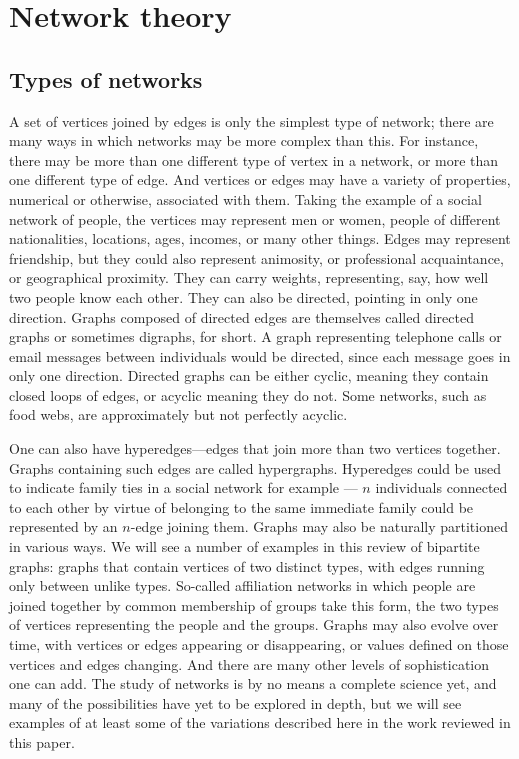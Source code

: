 \section{Network theory}

  \subsection{Types of networks}
    
    A set of vertices joined by edges is only the simplest type of network; there are many ways in which networks may be more complex than this. For instance, there may be more than one different type of vertex in a network, or more than one different type of edge. And vertices or edges may have a variety of properties, numerical or otherwise, associated with them. Taking the example of a social network of people, the vertices may represent men or women, people of different nationalities, locations, ages, incomes, or many other things. Edges may represent friendship, but they could also represent animosity, or professional acquaintance, or geographical proximity. They can carry weights, representing, say, how well two people know each other. They can also be directed, pointing in only one direction. Graphs composed of directed edges are themselves called directed graphs or sometimes digraphs, for short. A graph representing telephone calls or email messages between individuals would be directed, since each message goes in only one direction. Directed graphs can be either cyclic, meaning they contain closed loops of edges, or acyclic meaning they do not. Some networks, such as food webs, are approximately but not perfectly acyclic.
    
    One can also have hyperedges—edges that join more than two vertices together. Graphs containing such edges are called hypergraphs. Hyperedges could be used to indicate family ties in a social network for example --- $n$ individuals connected to each other by virtue of belonging to the same immediate family could be represented by an $n$-edge joining them. Graphs may also be naturally partitioned in various ways. We will see a number of examples in this review of bipartite graphs: graphs that contain vertices of two distinct types, with edges running only between unlike types. So-called affiliation networks in which people are joined together by common membership of groups take this form, the two types of vertices representing the people and the groups. Graphs may also evolve over time, with vertices or edges appearing or disappearing, or values defined on those vertices and edges changing. And there are many other levels of sophistication one can add. The study of networks is by no means a complete science yet, and many of the possibilities have yet to be explored in depth, but we will see examples of at least some of the variations described here in the work reviewed in this paper.
    
